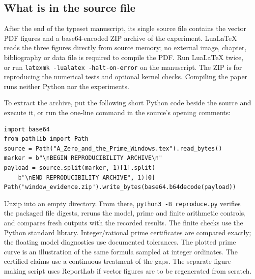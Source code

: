 \documentclass[12pt,letterpaper]{article}
\begin{document}
\subsection{What is in the source file}
After the end of the typeset manuscript, its single source file contains the vector PDF figures and a base64-encoded ZIP archive of the experiment. LuaLaTeX reads the three figures directly from source memory; no external image, chapter, bibliography or data file is required to compile the PDF. Run LuaLaTeX twice, or run \texttt{latexmk -lualatex -halt-on-error} on the manuscript. The ZIP is for reproducing the numerical tests and optional kernel checks. Compiling the paper runs neither Python nor the experiments.

To extract the archive, put the following short Python code beside the source and execute it, or run the one-line command in the source's opening comments:
\begin{verbatim}
import base64
from pathlib import Path
source = Path("A_Zero_and_the_Prime_Windows.tex").read_bytes()
marker = b"\nBEGIN REPRODUCIBILITY ARCHIVE\n"
payload = source.split(marker, 1)[1].split(
    b"\nEND REPRODUCIBILITY ARCHIVE", 1)[0]
Path("window_evidence.zip").write_bytes(base64.b64decode(payload))
\end{verbatim}
Unzip into an empty directory. From there, \texttt{python3 -B reproduce.py} verifies the packaged file digests, reruns the model, prime and finite arithmetic controls, and compares fresh outputs with the recorded results. The finite checks use the Python standard library. Integer/rational prime certificates are compared exactly; the floating model diagnostics use documented tolerances. The plotted prime curve is an illustration of the same formula sampled at integer ordinates. The certified claims use a continuous treatment of the gaps. The separate figure-making script uses ReportLab if vector figures are to be regenerated from scratch.
\end{document}
